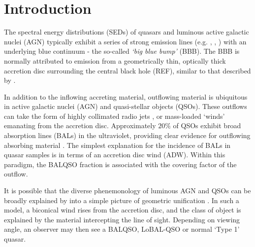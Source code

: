 \documentclass[useAMS,usenatbib]{mn2e_x}
\begin{document}



%
%

\section{Introduction}


The spectral energy distributions (SEDs) of 
quasars and luminous active galactic nuclei (AGN) 
typically exhibit a series of strong emission lines (e.g. \la, \civ, \nv) 
with an underlying blue continuum - the so-called {\sl `big blue bump'} (BBB). 
The BBB is normally attributed to emission from a geometrically thin, 
optically thick accretion disc surrounding the central black hole (REF), similar
to that described by \cite{shakurasunyaev1973}.

In addition to the inflowing accreting material, 
outflowing material is ubiquitous in active galactic nuclei (AGN) 
and quasi-stellar objects (QSOs). These outflows can take the form of 
highly collimated radio jets \citep{bellonijet2010}, 
or mass-loaded `winds' emanating from the accretion disc. 
Approximately $20\%$ of QSOs exhibit broad absorption lines (BALs) in the ultraviolet,
providing clear evidence for outflowing absorbing material
\citep{weymann1991, knigge2008, turnermiller2009, allen2011}.
The simplest explanation for the incidence of 
BALs in quasar samples is in terms of an accretion disc wind (ADW). 
Within this paradigm, the BALQSO fraction is associated with
the covering factor of the outflow.

It is possible that the  diverse phenemonology
of luminous AGN and QSOs can be broadly explained by
into a simple picture of geometric unification \citep[e.g.][]{MCGV95, elvis2000}. 
In such a model, a biconical wind rises from 
the accretion disc, and the class of object is explained by the material
intercepting the line of sight. Depending on viewing angle, an observer 
may then see a BALQSO, LoBAL-QSO or normal `Type 1' quasar.
\end{document}
